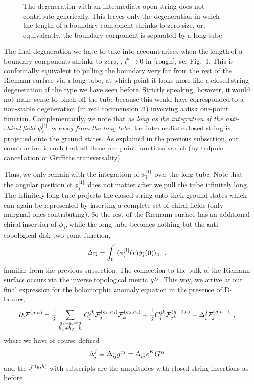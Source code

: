 \begin{figure}[ht]
\qquad
{}
\caption{The degeneration with an intermediate open string does not 
contribute generically. This leaves only the degeneration in which 
the length of a boundary component shrinks to zero size, or, 
equivalently, the boundary component is separated by a long tube.}
\label{degenopen2}
\end{figure}
The final degeneration we have to take into account arises when
the length of a boundary components shrinks to zero, \ie, $l^b\to 0$
in \eqref{rough}, see Fig.\ \ref{degenopen2}. This is conformally 
equivalent to pulling the boundary very far from the rest of the
Riemann surface via a long tube, at which point it looks more like
a closed string degeneration of the type we have seen before. 
Strictly speaking, however, it would not make sense to pinch off 
the tube because this would have corresponded to a non-stable 
degeneration (in real codimension 2!) involving a disk one-point 
function. Complementarily, we note that {\it as long as the integration 
of the anti-chiral field $\phi_{\bar i}^{[1]}$ is away from the long tube}, 
the intermediate closed string is projected onto the ground states. 
As explained in the previous subsection, our construction is such
that all these one-point functions vanish (by tadpole cancellation 
or Griffiths transversality).

Thus, we only remain with the integration of $\phi_{\bar i}^{[1]}$ over 
the long tube. Note that the angular position of $\phi_{\bar i}^{[1]}$
does not matter after we pull the tube infinitely long. The infinitely
long tube projects the closed string onto their ground states which
can again be represented by inserting a complete set of chiral fields
(only marginal ones contributing). So the rest of the Riemann surface 
has an additional chiral insertion of $\phi_j$, while the long tube 
becomes nothing but the anti-topological disk two-point function,
\begin{equation}
\Delta_{{\bar i}{\bar j}} = \int_{0}^{1} \langle \phi_{\bar i}^{[1]}(r)\phi_{\bar j}(0)
\rangle_{0,1} \,,
\end{equation}
familiar from the previous subsection. The connection to the bulk of
the Riemann surface occurs via the inverse topological metric 
$g^{{\bar j} j}$. This way, we arrive at our final expression for the 
holomorphic anomaly equation in the presence of D-branes,
\begin{equation}
\eqlabel{extended}
\del_\ib \F gh = 
\frac 12 \sum_{\topa{g_1+g_2=g}{h_1+h_2=h}} C_{\ib}^{jk}
\F {g_1}{h_1}_j \F {g_2}{h_2}_k +
\frac 12 C_{\ib}^{jk} \F {g-1}h_{jk} - 
\Delta_{\ib}^j \F g{h-1}_j  \,,
\end{equation}
where we have of course defined
\begin{equation}
\Delta_{{\bar i}}^j \equiv \Delta_{{\bar i}{\bar j}} g^{{\bar j} j} = \Delta_{{\bar i}{\bar j}} 
{\it e}^K G^{{\bar j} j}
\end{equation}
and the ${{\cal F}}^{(g,h)}$ with subscripts are the amplitudes with closed
string insertions as before. 

